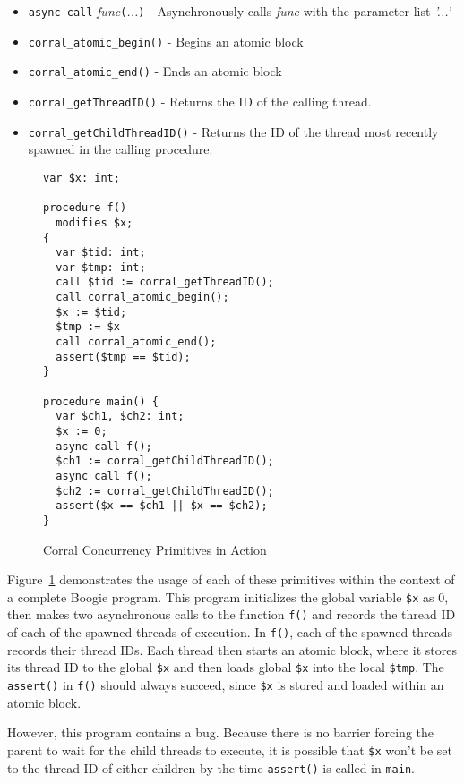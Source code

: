 \begin{itemize}
\item \lstinline|async call| \emph{func}\lstinline|(|\emph{...}\lstinline|)| - Asynchronously calls \emph{func} with the parameter list \emph{'...'}
\item \lstinline|corral_atomic_begin()| - Begins an atomic block
\item \lstinline|corral_atomic_end()| - Ends an atomic block
\item \lstinline|corral_getThreadID()| - Returns the ID of the calling thread.
\item \lstinline|corral_getChildThreadID()| - Returns the ID of the
  thread most recently spawned in the calling procedure. 
\end{itemize}

\begin{figure}[h]
\centering
\caption{Corral Concurrency Primitives in Action}
\label{fig:corralprimitives}
\begin{lstlisting}[language=boogie]
var $x: int;

procedure f() 
  modifies $x;
{
  var $tid: int;
  var $tmp: int;
  call $tid := corral_getThreadID();
  call corral_atomic_begin();
  $x := $tid;
  $tmp := $x
  call corral_atomic_end();
  assert($tmp == $tid);
}

procedure main() {
  var $ch1, $ch2: int;
  $x := 0;
  async call f();
  $ch1 := corral_getChildThreadID();
  async call f();
  $ch2 := corral_getChildThreadID();
  assert($x == $ch1 || $x == $ch2);
}
\end{lstlisting}
\end{figure}

Figure~\ref{fig:corralprimitives} demonstrates the usage of each of
these primitives within the context of a complete Boogie program.
This program initializes the global variable \lstinline|$x| as 0, then
makes two asynchronous calls to the function \lstinline|f()| and
records the thread ID of each of the spawned threads of execution.  In
\lstinline|f()|, each of the spawned threads records their thread IDs.
Each thread then starts an atomic block, where it stores its thread ID
to the global \lstinline|$x| and then loads global \lstinline|$x| into
the local \lstinline|$tmp|.  The \lstinline|assert()| in
\lstinline|f()| should always succeed, since \lstinline|$x| is stored
and loaded within an atomic block. 

However, this program contains a bug.  Because there is no barrier
forcing the parent to wait for the child threads to execute, it is
possible that \lstinline|$x| won't be set to the thread ID of either
children by the time \lstinline|assert()| is called in
\lstinline|main|.

